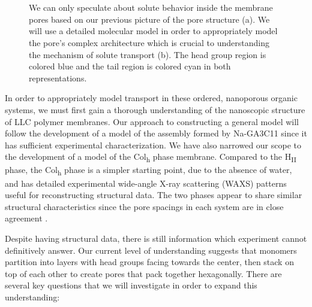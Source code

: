 \documentclass[journal=jpcbfk,manusciprt=article]{achemso}
\begin{document}
\begin{figure}
\begin{subfigure}{0.45\linewidth}
		\caption{}~\label{fig:detailed_pore}
	\end{subfigure}
  \caption{We can only speculate about solute behavior inside the membrane
	  pores based on our previous picture of the pore structure (a). We will use a
	  detailed molecular model in order to appropriately model the pore's complex
	  architecture which is crucial to understanding the mechanism of solute
	  transport (b). The head group region is colored blue
	  and the tail region is colored cyan in both representations.}~\label{fig:detail}
  \end{figure}
 
  In order to appropriately model transport in these ordered, nanoporous
  organic systems, we must first gain a thorough understanding of the nanoscopic
  structure of LLC polymer membranes. 
Our approach to constructing a general
  model will follow the development of a model of the assembly formed by
  Na-GA3C11 since it has sufficient experimental characterization. 
We have also
  narrowed our scope to the development of a model of the Col\textsubscript{h}
  phase membrane. Compared to the H\textsubscript{II} phase, the
  Col\textsubscript{h} phase is a simpler starting point, due to the absence of
  water, and has detailed experimental wide-angle X-ray scattering (WAXS)
  patterns useful for reconstructing structural data. The two phases appear to
  share similar structural characteristics since the pore spacings in each system
  are in close agreement \cite{feng_thin_2016,resel_structural_2000}.

  Despite having structural data, there is still information which experiment
  cannot definitively answer. 
Our current level of understanding suggests that
  monomers partition into layers with head groups facing towards the center, then 
  stack on top of each other to create pores that pack together hexagonally.
  There are several key questions that we will investigate in order to
  expand this understanding:
 
\end{document}
